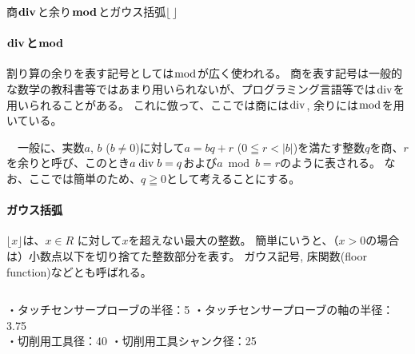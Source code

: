 \begin{Column}{商$\boldsymbol{\bDiv}$と余り$\boldsymbol{\bmod}$とガウス括弧$\boldsymbol{\lfloor\,\rfloor}$}
\renewcommand\theequation{c\thechapter.\arabic{equation}}
\setcounter{equation}{0}
\paragraph{$\boldsymbol\bDiv$と$\boldsymbol\bmod$}
割り算の余りを表す記号としては$\bmod$が広く使われる。
商を表す記号は一般的な数学の教科書等ではあまり用いられないが、プログラミング言語等では$\bDiv$を用いられることがある。
これに倣って、ここでは商には$\bDiv$, 余りには$\bmod$を用いている。

　一般に、実数$a$, $b$ ($b\neq0$)に対して$a = bq+r$ ($0 \leqq r < |b|$)を満たす整数$q$を商、$r$を余りと呼び、このとき$a \bDiv b = q$および$a \bmod b = r$のように表される。
なお、ここでは簡単のため、$q \geqq 0$として考えることにする。
\tcbline*
\paragraph{ガウス括弧}
$\lfloor x\rfloor$は、$x \in R$ に対して$x$を超えない最大の整数。
簡単にいうと、（$x > 0$の場合は）小数点以下を切り捨てた整数部分を表す。
ガウス記号, 床関数(floor function)などとも呼ばれる。
\end{Column}
\begin{tcolorbox}[title={内面溝加工に関する工具(T31, T50)の情報}, fonttitle=\gtfamily\bfseries]
・タッチセンサープローブの半径：5 \quad ・タッチセンサープローブの軸の半径：3.75\\
・切削用工具径：40 \quad ・切削用工具シャンク径：25
\end{tcolorbox}





